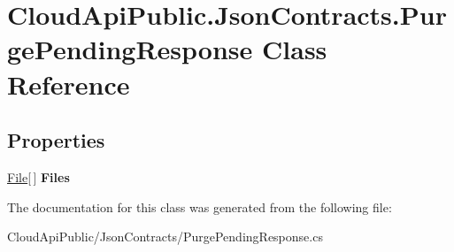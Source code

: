\hypertarget{class_cloud_api_public_1_1_json_contracts_1_1_purge_pending_response}{\section{Cloud\-Api\-Public.\-Json\-Contracts.\-Purge\-Pending\-Response Class Reference}
\label{class_cloud_api_public_1_1_json_contracts_1_1_purge_pending_response}
}
\subsection*{Properties}
\begin{DoxyCompactItemize}
\item 
\hypertarget{class_cloud_api_public_1_1_json_contracts_1_1_purge_pending_response_a0cd0535e25ea35a5d9b8c8e6955a8052}{\hyperlink{class_cloud_api_public_1_1_json_contracts_1_1_file}{File}\mbox{[}$\,$\mbox{]} {\bfseries Files}}\label{class_cloud_api_public_1_1_json_contracts_1_1_purge_pending_response_a0cd0535e25ea35a5d9b8c8e6955a8052}

\end{DoxyCompactItemize}


The documentation for this class was generated from the following file\-:\begin{DoxyCompactItemize}
\item 
Cloud\-Api\-Public/\-Json\-Contracts/Purge\-Pending\-Response.\-cs\end{DoxyCompactItemize}
